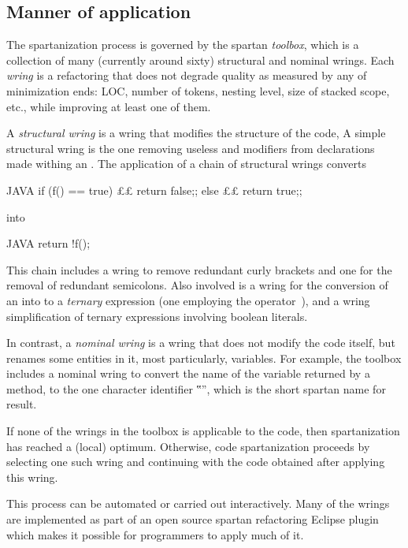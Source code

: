 \subsection{Manner of application}
\label{section:manner}
The spartanization process is governed by the spartan
\emph{toolbox}, which is a collection of many (currently around sixty)
structural and nominal wrings. Each \emph{wring} is a refactoring that does
not degrade quality as measured by any of minimization ends: LOC, number of
tokens, nesting level, size of stacked scope, etc., while improving at least
one of them.

A \emph{structural wring} is a wring that modifies the structure of the code, A
simple structural wring is the one removing useless  and
 modifiers from declarations made withing an .
The application of a chain of structural wrings converts
\begin{lcode}{JAVA}
if (f() == true) {££
  return false;;
} else {££
  return true;;
}
\end{lcode}
\noindent into
\begin{lcode}{JAVA}
return !f();
\end{lcode}
\noindent
This chain includes a wring to remove redundant curly brackets and one for the
removal of redundant semicolons.
Also involved is a wring for the conversion of an  into to a
\emph{ternary} expression (one employing the operator~), and a
wring simplification of ternary expressions involving boolean literals.

In contrast, a \emph{nominal wring} is a wring that does not modify the
code itself, but renames some entities in it, most particularly, variables.
For example, the toolbox includes a nominal wring to convert the name of the
variable returned by a method, to the one character identifier ‟\cc{\$}”,
which is the short spartan name for result.

If none of the wrings in the toolbox is applicable to the code, then
spartanization has reached a (local) optimum. Otherwise, code spartanization
proceeds by selecting one such wring and continuing with the code obtained
after applying this wring.

This process can be automated or carried out interactively. Many of the wrings
are implemented as part of an open source spartan refactoring Eclipse
plugin which
makes it possible for programmers to apply much of it.


